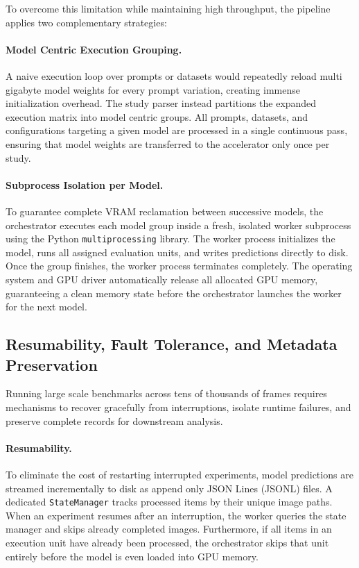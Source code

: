 To overcome this limitation while maintaining high throughput, the pipeline applies two complementary strategies:

\paragraph{Model Centric Execution Grouping.}
A naive execution loop over prompts or datasets would repeatedly reload multi gigabyte model weights for every prompt variation, creating immense initialization overhead. The study parser instead partitions the expanded execution matrix into model centric groups. All prompts, datasets, and configurations targeting a given model are processed in a single continuous pass, ensuring that model weights are transferred to the accelerator only once per study.

\paragraph{Subprocess Isolation per Model.}
To guarantee complete VRAM reclamation between successive models, the orchestrator executes each model group inside a fresh, isolated worker subprocess using the Python \texttt{multiprocessing} library. The worker process initializes the model, runs all assigned evaluation units, and writes predictions directly to disk. Once the group finishes, the worker process terminates completely. The operating system and GPU driver automatically release all allocated GPU memory, guaranteeing a clean memory state before the orchestrator launches the worker for the next model.

\subsection{Resumability, Fault Tolerance, and Metadata Preservation}
\label{subsec:resumability_provenance}

Running large scale benchmarks across tens of thousands of frames requires mechanisms to recover gracefully from interruptions, isolate runtime failures, and preserve complete records for downstream analysis.

\paragraph{Resumability.}
To eliminate the cost of restarting interrupted experiments, model predictions are streamed incrementally to disk as append only JSON Lines (JSONL) files. A dedicated \texttt{StateManager} tracks processed items by their unique image paths. When an experiment resumes after an interruption, the worker queries the state manager and skips already completed images. Furthermore, if all items in an execution unit have already been processed, the orchestrator skips that unit entirely before the model is even loaded into GPU memory.

